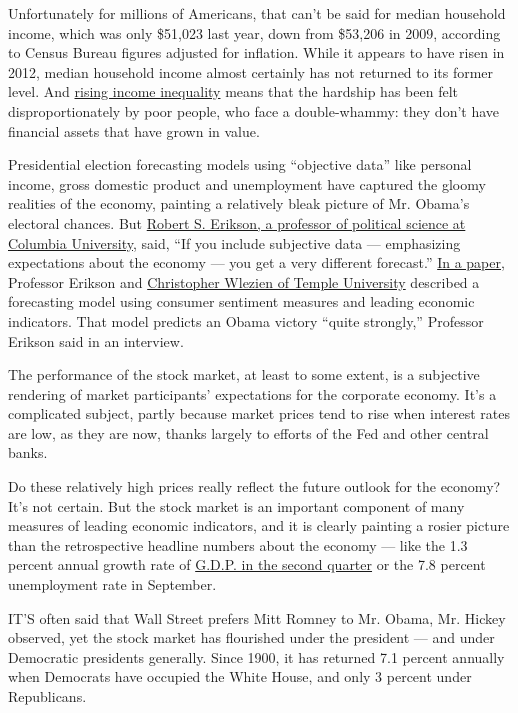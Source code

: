 Unfortunately for millions of Americans, that can't be said for median
household income, which was only \$51,023 last year, down from \$53,206
in 2009, according to Census Bureau figures adjusted for inflation.
While it appears to have risen in 2012, median household income almost
certainly has not returned to its former level. And
\href{http://elections.nytimes3xbfgragh.onion/2012/debates/presidential/2012-10-16\#fact-checks}{rising
income inequality} means that the hardship has been felt
disproportionately by poor people, who face a double-whammy: they don't
have financial assets that have grown in value.

Presidential election forecasting models using ``objective data'' like
personal income, gross domestic product and unemployment have captured
the gloomy realities of the economy, painting a relatively bleak picture
of Mr. Obama's electoral chances. But
\href{http://www.columbia.edu/\&}{Robert S. Erikson, a professor of
political science at Columbia University}, said, ``If you include
subjective data --- emphasizing expectations about the economy --- you
get a very different forecast.''
\href{http://papers.ssrn.com/sol3/papers.cfm?abstract_id=2110791}{In a
paper}, Professor Erikson and
\href{http://www.cla.temple.edu/politicalscience/faculty/wlezien.shtml}{Christopher
Wlezien of Temple University} described a forecasting model using
consumer sentiment measures and leading economic indicators. That model
predicts an Obama victory ``quite strongly,'' Professor Erikson said in
an interview.

The performance of the stock market, at least to some extent, is a
subjective rendering of market participants' expectations for the
corporate economy. It's a complicated subject, partly because market
prices tend to rise when interest rates are low, as they are now, thanks
largely to efforts of the Fed and other central banks.

Do these relatively high prices really reflect the future outlook for
the economy? It's not certain. But the stock market is an important
component of many measures of leading economic indicators, and it is
clearly painting a rosier picture than the retrospective headline
numbers about the economy --- like the 1.3 percent annual growth rate of
\href{http://www.bea.gov/newsreleases/glance.htm}{G.D.P. in the second
quarter} or the 7.8 percent unemployment rate in September.

IT'S often said that Wall Street prefers Mitt Romney to Mr. Obama, Mr.
Hickey observed, yet the stock market has flourished under the president
--- and under Democratic presidents generally. Since 1900, it has
returned 7.1 percent annually when Democrats have occupied the White
House, and only 3 percent under Republicans.


